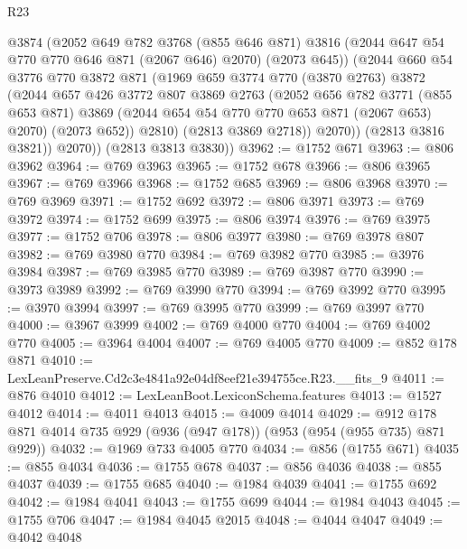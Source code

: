 \begin{lexlean}{R23}
\begin{coremodule}
              @3874
              (@2052
                @649
                @782
                @3768
                (@855 @646 @871)
                @3816
                (@2044 @647 @54 @770 @770 @646 @871 (@2067 @646) @2070)
                (@2073 @645))
              (@2044
                @660
                @54
                @3776
                @770
                @3872
                @871
                (@1969
                  @659
                  @3774
                  @770
                  (@3870 @2763)
                  @3872
                  (@2044
                    @657
                    @426
                    @3772
                    @807
                    @3869
                    @2763
                    (@2052
                      @656
                      @782
                      @3771
                      (@855 @653 @871)
                      @3869
                      (@2044 @654 @54 @770 @770 @653 @871 (@2067 @653) @2070)
                      (@2073 @652))
                    @2810)
                  (@2813 @3869 @2718))
                @2070))
            (@2813 @3816 @3821))
          @2070))
      (@2813 @3813 @3830))
@3962 := @1752 @671
@3963 := @806 @3962
@3964 := @769 @3963
@3965 := @1752 @678
@3966 := @806 @3965
@3967 := @769 @3966
@3968 := @1752 @685
@3969 := @806 @3968
@3970 := @769 @3969
@3971 := @1752 @692
@3972 := @806 @3971
@3973 := @769 @3972
@3974 := @1752 @699
@3975 := @806 @3974
@3976 := @769 @3975
@3977 := @1752 @706
@3978 := @806 @3977
@3980 := @769 @3978 @807
@3982 := @769 @3980 @770
@3984 := @769 @3982 @770
@3985 := @3976 @3984
@3987 := @769 @3985 @770
@3989 := @769 @3987 @770
@3990 := @3973 @3989
@3992 := @769 @3990 @770
@3994 := @769 @3992 @770
@3995 := @3970 @3994
@3997 := @769 @3995 @770
@3999 := @769 @3997 @770
@4000 := @3967 @3999
@4002 := @769 @4000 @770
@4004 := @769 @4002 @770
@4005 := @3964 @4004
@4007 := @769 @4005 @770
@4009 := @852 @178 @871
@4010 := LexLeanPreserve.Cd2c3e4841a92e04df8eef21e394755ce.R23.__fits_9
@4011 := @876 @4010
@4012 := LexLeanBoot.LexiconSchema.features
@4013 := @1527 @4012
@4014 := @4011 @4013
@4015 := @4009 @4014
@4029 := @912 @178 @871 @4014 @735 @929 (@936 (@947 @178)) (@953 (@954 (@955 @735) @871 @929))
@4032 := @1969 @733 @4005 @770
@4034 := @856 (@1755 @671)
@4035 := @855 @4034
@4036 := @1755 @678
@4037 := @856 @4036
@4038 := @855 @4037
@4039 := @1755 @685
@4040 := @1984 @4039
@4041 := @1755 @692
@4042 := @1984 @4041
@4043 := @1755 @699
@4044 := @1984 @4043
@4045 := @1755 @706
@4047 := @1984 @4045 @2015
@4048 := @4044 @4047
@4049 := @4042 @4048

\end{coremodule}
\end{lexlean}
